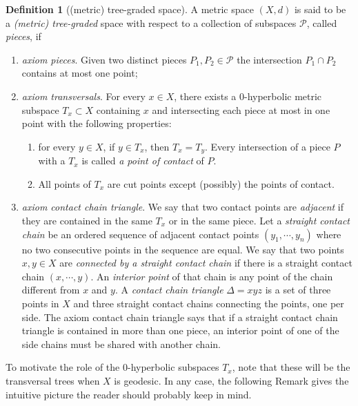 \documentclass[12pt,article]{amsart}
\numberwithin{equation}{section}
\numberwithin{figure}{section}
\theoremstyle{definition}
\newtheorem{definition}[equation]{Definition}
\theoremstyle{plain}
\begin{document}
\begin{definition}[(metric) tree-graded space]
A metric space $(X,d)$ is said to be a \emph{(metric) tree-graded} space with respect to a collection of subspaces $\mathcal{P}$, called \emph{pieces}, if 
\begin{enumerate}
    \item \emph{axiom pieces}. Given two distinct pieces $P_1, P_2 \in \mathcal{P}$ the intersection $P_1 \cap P_2$ contains at most one point;
    \item \emph{axiom transversals}. For every $x \in X$, there exists a $0$-hyperbolic metric subspace $T_x \subset X$ containing $x$ and intersecting each piece at most in one point with the following properties:  
    \begin{enumerate}
    \item for every $y \in X$, if $y \in T_x$, then $T_x=T_y$. Every intersection of a piece $P$ with a $T_x$ is called \emph{a point of contact} of $P$.
    \item All points of $T_x$ are cut points except (possibly) the points of contact.
    \end{enumerate}
    \item \emph{axiom contact chain triangle}. We say that two contact points are \emph{adjacent} if they are contained in the same $T_x$ or in the same piece.
    Let a \emph{straight contact chain} be an ordered sequence of adjacent contact points $(y_1,\cdots,y_n)$ where no two consecutive points in the sequence are equal. We say that two points $x,y \in X$ are \emph{connected by a straight contact chain} if there is a straight contact chain $(x,\cdots,y)$. An \emph{interior point} of that chain is any point of the chain different from $x$ and $y$. A \emph{contact chain triangle} $\Delta=xyz$ is a set of three points in $X$ and three straight contact chains connecting the points, one per side. The axiom contact chain triangle says that if a straight contact chain triangle is contained in more than one piece, an interior point of one of the side chains must be shared with another chain.
    \end{enumerate}
\label{def:treegraded_drmg}
\end{definition}
To motivate the role of the $0$-hyperbolic subspaces $T_x$, note that these will be the transversal trees when $X$ is geodesic.
In any case, the following Remark gives the intuitive picture the reader should probably keep in mind.
\end{document}
